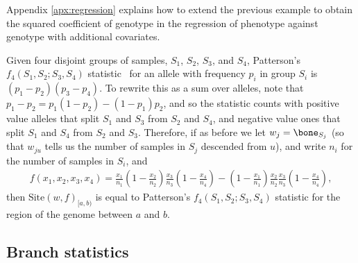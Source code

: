 \documentclass{article}
\newcommand{\site}{\mbox{Site}} %
\newcommand{\iw}{w} %
\begin{document}
Appendix \ref{apx:regression} explains how to extend the previous example
to obtain the squared coefficient of genotype in the regression of phenotype
against genotype with additional covariates.

\begin{example}[Patterson's $f_4$] \label{ex:site_f4}
    Given four disjoint groups of samples, $S_1$, $S_2$, $S_3$, and $S_4$,
    Patterson's $f_4(S_1, S_2; S_3, S_4)$
    statistic~\citep{reich2009reconstructing,patterson2012ancient}
    for an allele with frequency $p_i$ in group $S_i$
    is $(p_1 - p_2)(p_3 - p_4)$. To rewrite this as a sum over alleles, note that
    $p_1 - p_2 = p_1 (1 - p_2) - (1 - p_1) p_2$,
    and so the statistic counts with positive value
    alleles that split $S_1$ and $S_3$ from $S_2$ and $S_4$,
    and negative value ones that split $S_1$ and $S_4$ from $S_2$ and $S_3$.
    Therefore, if as before we
    let $\iw_j = \bone_{S_j}$
    (so that $\iw_{ju}$ tells us the number of samples in $S_j$ descended from $u$),
    and write $n_i$ for the number of samples in $S_i$, and
    \begin{align*}
        f(x_1, x_2, x_3, x_4)
        =
        \frac{x_1}{n_1}
        \left(1 - \frac{x_2}{n_2}\right)
        \frac{x_3}{n_3}
        \left(1 - \frac{x_4}{n_4}\right)
        -
        \left(1 - \frac{x_1}{n_1}\right)
        \frac{x_2}{n_2}
        \frac{x_3}{n_3}
        \left(1 - \frac{x_4}{n_4}\right),
    \end{align*}
    then $\site(\iw, f)_{[a,b)}$ is equal to Patterson's $f_4(S_1, S_2; S_3, S_4)$ statistic
    for the region of the genome between $a$ and $b$.
\end{example}



\subsection*{Branch statistics}
\end{document}
